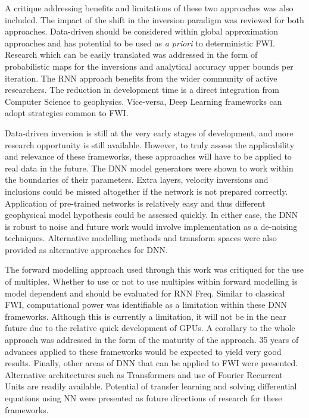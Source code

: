 A critique addressing benefits and limitations of these two approaches was also included. The impact of the shift in the inversion paradigm was reviewed for both approaches. Data-driven should be considered within global approximation approaches and has potential to be used as \emph{a priori} to deterministic FWI. Research which can be easily translated was addressed in the form of probabilistic maps for the inversions and analytical accuracy upper bounds per iteration. The RNN approach benefits from the wider community of active researchers. The reduction in development time is a direct integration from Computer Science to geophysics. Vice-versa, Deep Learning frameworks can adopt strategies common to FWI. 

Data-driven inversion is still at the very early stages of development, and more research opportunity is still available. However, to truly assess the applicability and relevance of these frameworks, these approaches will have to be applied to real data in the future. The DNN model generators were shown to work within the boundaries of their parameters. Extra layers, velocity inversions and inclusions could be missed altogether if the network is not prepared correctly. Application of pre-trained networks is relatively easy and thus different geophysical model hypothesis could be assessed quickly. In either case, the DNN is robust to noise and future work would involve implementation as a de-noising techniques. Alternative modelling methods and transform spaces were also provided as alternative approaches for DNN. 

The forward modelling approach used through this work was critiqued for the use of multiples. Whether to use or not to use multiples within forward modelling is model dependent and should be evaluated for RNN Freq. Similar to classical FWI, computational power was identifiable as a limitation within these DNN frameworks. Although this is currently a limitation, it will not be in the near future due to the relative quick development of GPUs. A corollary to the whole approach was addressed in the form of the maturity of the approach. 35 years of advances applied to these frameworks would be expected to yield very good results. Finally, other areas of DNN that can be applied to FWI were presented. Alternative architectures such as Transformers and use of Fourier Recurrent Units are readily available. Potential of transfer learning and solving differential equations using NN were presented as future directions of research for these frameworks.